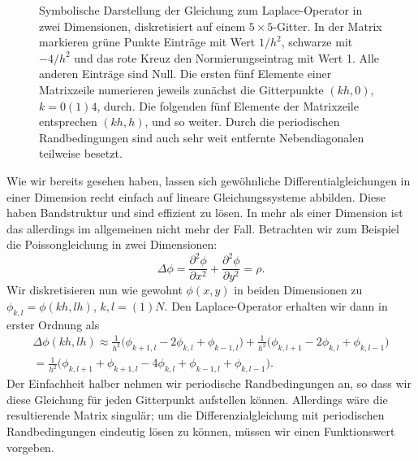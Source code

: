 \begin{figure}
  \caption{Symbolische Darstellung der Gleichung zum Laplace-Operator
    in zwei Dimensionen, diskretisiert auf einem $5\times
    5$-Gitter. In der Matrix markieren grüne Punkte Einträge mit Wert
    $1/h^2$, schwarze mit $-4/h^2$ und das rote Kreuz den
    Normierungseintrag mit Wert 1. Alle anderen Einträge sind
    Null. Die ersten fünf Elemente einer Matrixzeile numerieren
    jeweils zunächst die Gitterpunkte $(k h, 0)$, $k=0(1)4$,
    durch. Die folgenden fünf Elemente der Matrixzeile entsprechen $(k
    h, h)$, und so weiter. Durch die periodischen Randbedingungen sind
    auch sehr weit entfernte Nebendiagonalen teilweise besetzt.}
  \label{fig:2d-laplace}
\end{figure}

Wie wir bereits gesehen haben, lassen sich gewöhnliche
Differentialgleichungen in einer Dimension recht einfach auf lineare
Gleichungssysteme abbilden. Diese haben Bandstruktur und sind
effizient zu lösen.  In mehr als einer Dimension ist das allerdings im
allgemeinen nicht mehr der Fall. Betrachten wir zum Beispiel die
Poissongleichung in zwei Dimensionen:
\begin{equation}
  \label{eq:laplace}
  \Delta \phi = \frac{\partial^2 \phi}{\partial x^2} +
  \frac{\partial^2 \phi}{\partial y^2} = \rho.
\end{equation}
Wir diskretisieren nun wie gewohnt $\phi(x,y)$ in beiden Dimensionen
zu $\phi_{k, l} = \phi(k h, l h)$, $k,l=(1)N$. Den Laplace-Operator
erhalten wir dann in erster Ordnung als
\begin{align}
  \label{eq:laplacedisc}
  \Delta \phi(k h, l h) \approx
  \frac{1}{h^2}\bigl(\phi_{k+1,l} -
  2\phi_{k,l}  + \phi_{k-1,l}\bigr) + 
  \frac{1}{h^2}\bigl(\phi_{k,l+1} -
  2\phi_{k,l}  + \phi_{k,l-1}\bigr)\nonumber\\
  = \frac{1}{h^2}\bigl(
  \phi_{k,l+1} + \phi_{k+1,l} - 4\phi_{k,l} +
  \phi_{k-1,l} + \phi_{k,l-1}\bigr).
\end{align}
Der Einfachheit halber nehmen wir periodische Randbedingungen an, so
dass wir diese Gleichung für jeden Gitterpunkt aufstellen
können. Allerdings wäre die resultierende Matrix singulär; um die
Differenzialgleichung mit periodischen Randbedingungen eindeutig lösen
zu können, müssen wir einen Funktionswert vorgeben.

